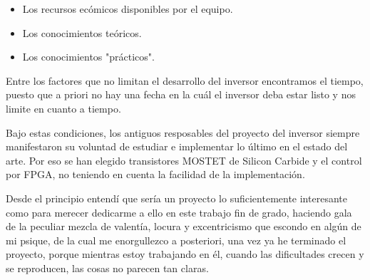 \begin{itemize}
    \item Los recursos ecómicos disponibles por el equipo. 
    \item Los conocimientos teóricos.
    \item Los conocimientos "prácticos".
\end{itemize}

Entre los factores que no limitan el desarrollo del inversor encontramos el
tiempo, puesto que a priori no hay una fecha en la cuál el inversor deba estar
listo y nos limite en cuanto a tiempo.

Bajo estas condiciones, los antiguos resposables del proyecto del inversor
siempre manifestaron su voluntad de estudiar e implementar lo último en el
estado del arte. Por eso se han elegido transistores MOSTET de Silicon Carbide
y el control por FPGA, no teniendo en cuenta la facilidad de la implementación.

Desde el principio entendí que sería un proyecto lo suficientemente interesante
como para merecer dedicarme a ello en este trabajo fin de grado, haciendo gala
de la peculiar mezcla de valentía, locura y excentricismo que escondo en algún
de mi psique, de la cual me enorgullezco a posteriori, una vez ya he terminado
el proyecto, porque mientras estoy trabajando en él, cuando las dificultades
crecen y se reproducen, las cosas no parecen tan claras.